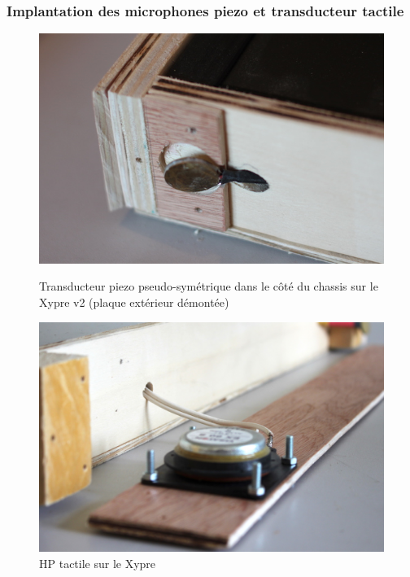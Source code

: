 \subsubsection{Implantation des microphones piezo et transducteur tactile}
\begin{figure}[!htbp]
	\captionsetup{format=plain}%
	\centering
	\begin{minipage}[t]{0.48\textwidth}
	    \includegraphics[width=\linewidth]{gfx/05_interfaces/xypre-piezo_72dpi.jpg}
		\caption{Transducteur piezo pseudo-symétrique dans le côté du chassis sur le Xypre v2 (plaque extérieur démontée)}
		\label{fig:interface:xypre_v2-piezo1}
	\end{minipage}
	\hspace{.02\linewidth}
	\begin{minipage}[t]{0.48\textwidth}
	    \includegraphics[width=\linewidth]{gfx/05_interfaces/Xypre_HP_144dpi.jpg}
		\caption{HP tactile sur le Xypre}
		\label{fig:interface:xypre_v2-hp}
	\end{minipage}
\end{figure}

